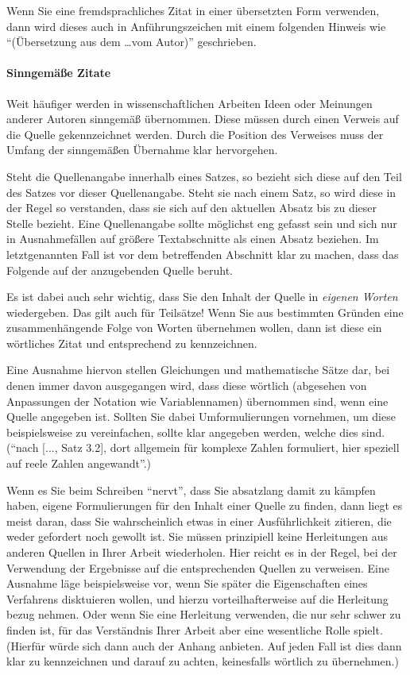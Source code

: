 Wenn Sie eine fremdsprachliches Zitat in einer übersetzten Form verwenden, dann wird dieses auch in Anführungszeichen mit einem folgenden Hinweis wie "`(Übersetzung aus dem \ldots vom Autor)"' geschrieben.


\paragraph{Sinngemäße Zitate}
Weit häufiger werden in wissenschaftlichen Arbeiten Ideen oder Meinungen anderer Autoren sinngemäß übernommen.
Diese müssen durch einen Verweis auf die Quelle gekennzeichnet werden.
Durch die Position des Verweises muss der Umfang der sinngemäßen Übernahme klar hervorgehen.

Steht die Quellenangabe innerhalb eines Satzes, so bezieht sich diese auf den Teil des Satzes vor dieser Quellenangabe.
Steht sie nach einem Satz, so wird diese in der Regel so verstanden, dass sie sich auf den aktuellen Absatz bis zu dieser Stelle bezieht.
Eine Quellenangabe sollte möglichst eng gefasst sein und sich nur in Ausnahmefällen auf größere Textabschnitte als einen Absatz beziehen.
Im letztgenannten Fall ist vor dem betreffenden Abschnitt klar zu machen, dass das Folgende auf der anzugebenden Quelle beruht.

Es ist dabei auch sehr wichtig, dass Sie den Inhalt der Quelle in \emph{eigenen Worten} wiedergeben.
Das gilt auch für Teilsätze!
Wenn Sie aus bestimmten Gründen eine zusammenhängende Folge von Worten übernehmen wollen, dann ist diese ein wörtliches Zitat und entsprechend zu kennzeichnen.

Eine Ausnahme hiervon stellen Gleichungen und mathematische Sätze dar, bei denen immer davon ausgegangen wird, dass diese wörtlich (abgesehen von Anpassungen der Notation wie Variablennamen) übernommen sind, wenn eine Quelle angegeben ist.
Sollten Sie dabei Umformulierungen vornehmen, um diese beispielsweise zu vereinfachen, sollte klar angegeben werden, welche dies sind.
(\ZB "`nach [..., Satz 3.2], dort allgemein für komplexe Zahlen formuliert, hier speziell auf reele Zahlen angewandt"'.)

Wenn es Sie beim Schreiben "`nervt"', dass Sie absatzlang damit zu kämpfen haben, eigene Formulierungen für den Inhalt einer Quelle zu finden, dann liegt es meist daran, dass Sie wahrscheinlich etwas in einer Ausführlichkeit zitieren, die weder gefordert noch gewollt ist.
Sie müssen prinzipiell keine Herleitungen aus anderen Quellen in Ihrer Arbeit wiederholen.
Hier reicht es in der Regel, bei der Verwendung der Ergebnisse auf die entsprechenden Quellen zu verweisen.
Eine Ausnahme läge beispielsweise vor, wenn Sie später die Eigenschaften eines Verfahrens disktuieren wollen, und hierzu vorteilhafterweise auf die Herleitung bezug nehmen.
Oder wenn Sie eine Herleitung verwenden, die nur sehr schwer zu finden ist, für das Verständnis Ihrer Arbeit aber eine wesentliche Rolle spielt.
(Hierfür würde sich dann \zB auch der Anhang anbieten. Auf jeden Fall ist dies dann klar zu kennzeichnen und darauf zu achten, keinesfalls wörtlich zu übernehmen.)


